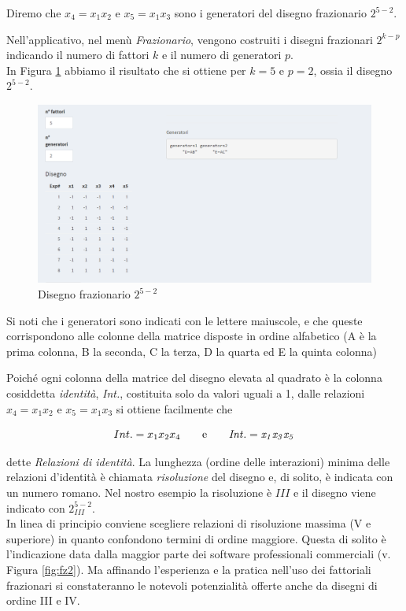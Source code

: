\documentclass[
  11pt,
]{book}
\begin{document}
Diremo che \(x_4=x_1x_2\) e \(x_5=x_1x_3\) sono i generatori del disegno frazionario \(2^{5-2}\).

Nell'applicativo, nel menù \emph{Frazionario}, vengono costruiti i disegni frazionari \(2^{k-p}\) indicando il numero di fattori \(k\) e il numero di generatori \(p\).\\
In Figura \ref{fig:fz1} abbiamo il risultato che si ottiene per \(k=5\) e \(p=2\), ossia il disegno \(2^{5-2}\).

\begin{figure}[ht]

{\centering \includegraphics[width=1\linewidth]{Immagini/Fraz/01_fraz} 

}

\caption{Disegno frazionario $2^{5-2}$}\label{fig:fz1}
\end{figure}

Si noti che i generatori sono indicati con le lettere maiuscole, e che queste corrispondono alle colonne della matrice disposte in ordine alfabetico (A è la prima colonna, B la seconda, C la terza, D la quarta ed E la quinta colonna)

Poiché ogni colonna della matrice del disegno elevata al quadrato è la colonna cosiddetta \emph{identità}, \emph{Int.}, costituita solo da valori uguali a 1, dalle relazioni \(x_4=x_1x_2\) e \(x_5=x_1x_3\) si ottiene facilmente che

\[
Int.=x_1x_2x_4 \qquad  \rm{e} \qquad \it{Int.} = x_1x_3x_5 
\]

dette \emph{Relazioni di identità}. La lunghezza (ordine delle interazioni) minima delle relazioni d'identità è chiamata \emph{risoluzione} del disegno e, di solito, è indicata con un numero romano. Nel nostro esempio la risoluzione è \(III\) e il disegno viene indicato con \(2^{5-2}_{III}\).\\
In linea di principio conviene scegliere relazioni di risoluzione massima (V e superiore) in quanto confondono termini di ordine maggiore. Questa di solito è l'indicazione data dalla maggior parte dei software professionali commerciali (v. Figura \ref{fig:fz2}). Ma affinando l'esperienza e la pratica nell'uso dei fattoriali frazionari si constateranno le notevoli potenzialità offerte anche da disegni di ordine III e IV.
\end{document}
